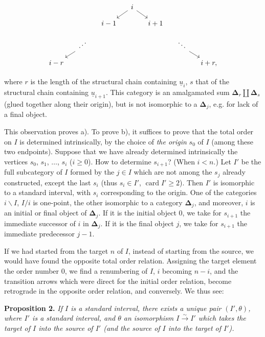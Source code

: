 \documentclass[11pt]{article}
\newcommand{\printedpage}[1]{\marginpar{\footnotesize p.~#1}}
\newcommand{\msp}[1]{\marginpar{\footnotesize [#1]}}
\newcommand{\bD}{\boldsymbol{\Delta}}
\newcommand{\iddots}{\mathinner{\mkern1mu\raise1pt\hbox{.}\mkern2mu\raise4pt\hbox{.}\mkern2mu\raise7pt\hbox{.}\mkern1mu}}
\begin{document}
\printedpage{4}

\[
\begin{tikzcd}[column sep=small, row sep=small]
 & & & i \arrow[dl] \arrow[dr] & & & \\
 & & i-1 & & i+1 & & \\
 & \iddots \arrow[dl] & & & & \ddots \arrow[dr] & \\
 i-r & & & & & & i+r, %
\end{tikzcd}
\]

where $r$ is the length of the structural chain containing $\underline{u}_i$, $s$ that of the structural chain containing $\underline{u}_{i+1}$. This category is an amalgamated sum $\bD_r \amalg \bD_s$ (glued together along their origin), but is not isomorphic to a $\bD_j$, e.g. for lack of a final object.

This observation proves a). To prove b), it suffices to prove that the total order on $I$ is determined intrinsically, by the choice of \textit{the origin} $s_0$ of $I$ (among these %
two endpoints). Suppose that we have already determined intrinsically the vertices $s_0$, $s_1$, $\ldots$, $s_i$ ($i \geq 0$). How to determine $s_{i+1}$? (When $i < n$.) Let $I'$ be the full subcategory of $I$
\msp{page 7}
formed by the $j \in I$ which are not among the $s_j$ already constructed, except the last $s_i$ (thus $s_i \in I'$, $\operatorname{card} I' \geq 2$). Then $I'$ is isomorphic to a standard interval, with $s_i$ corresponding to the origin. One of the categories $i\backslash I$, $I/i$ is one-point, the other isomorphic to a category $\bD_j$, and moreover, $i$ is an initial or final object of $\bD_j$. If it is the initial object $0$, we take for $s_{i+1}$ the immediate successor of $i$ in $\bD_j$. If it is the final object $j$, we take for $s_{i+1}$ the immediate predecessor $j-1$.

If we had started from the target $n$ of $I$, instead of starting from the source, we would have found the opposite total order relation. Assigning the target element the order number $0$, we find a renumbering of $I$, $i$ becoming $n-i$, and the transition arrows which were direct for the initial order relation, become retrograde in the opposite order relation, and conversely. We thus see:

\textbf{Proposition 2.} \textit{If $I$ is a standard interval, there exists a unique pair $(I',\theta)$, where $I'$ is a standard interval, and $\theta$ an isomorphism $I \xrightarrow{\sim} I'$ which takes the target of $I$ into the source of $I'$ (and the source of $I$ into the target of $I'$).}
\end{document}
